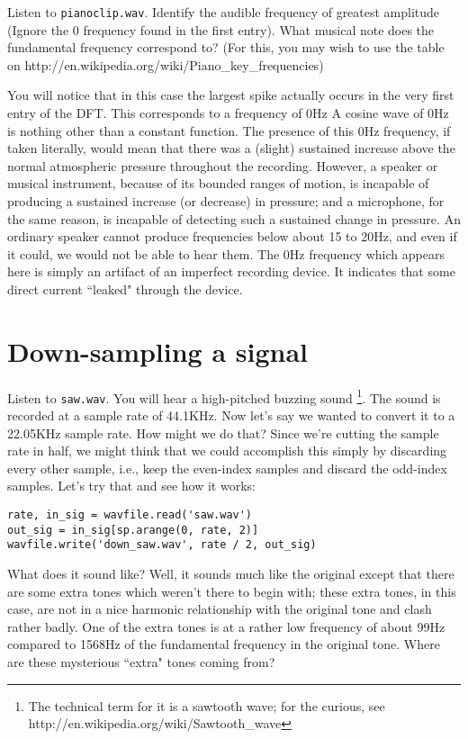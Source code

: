 \begin{problem}
Listen to \texttt{pianoclip.wav}.
Identify the audible frequency of greatest amplitude (Ignore the 0 frequency found in the first entry).
What musical note does the fundamental frequency correspond to?
(For this, you may wish to use the table on http://en.wikipedia.org/wiki/Piano\_key\_frequencies)
\end{problem}

You will notice that in this case the largest spike actually occurs in the very first entry of the DFT.
This corresponds to a frequency of 0Hz
 A cosine wave of 0Hz is nothing other than a constant function.
 The presence of this 0Hz frequency, if taken literally, would mean that there was a (slight) sustained increase above the normal atmospheric pressure throughout the recording.
 However, a speaker or musical instrument, because of its bounded ranges of motion, is incapable of producing a sustained increase (or decrease) in pressure; and a microphone, for the same reason, is incapable of detecting such a sustained change in pressure.
 An ordinary speaker cannot produce frequencies below about 15 to 20Hz, and even if it could, we would not be able to hear them.
 The 0Hz frequency which appears here is simply an artifact of an imperfect recording device.
 It indicates that some direct current ``leaked" through the device.



\section*{Down-sampling a signal}

Listen to \texttt{saw.wav}.
You will hear a high-pitched buzzing sound \footnote{The technical term for it is a sawtooth wave; for the curious, see http://en.wikipedia.org/wiki/Sawtooth\_wave}.
The sound is recorded at a sample rate of 44.1KHz.
Now let's say we wanted to convert it to a 22.05KHz sample rate. How might we do that?
Since we're cutting the sample rate in half, we might think that we could accomplish this simply by discarding every other sample, i.e., keep the even-index samples and discard the odd-index samples.
Let's try that and see how it works:
\begin{lstlisting}
rate, in_sig = wavfile.read('saw.wav')
out_sig = in_sig[sp.arange(0, rate, 2)]
wavfile.write('down_saw.wav', rate / 2, out_sig)
\end{lstlisting}
What does it sound like?
Well, it sounds much like the original except that there are some extra tones which weren't there to begin with; these extra tones, in this case, are not in a nice harmonic relationship with the original tone and clash rather badly.
One of the extra tones is at a rather low frequency of about 99Hz compared to 1568Hz of the fundamental frequency in the original tone.
Where are these mysterious ``extra" tones coming from?

